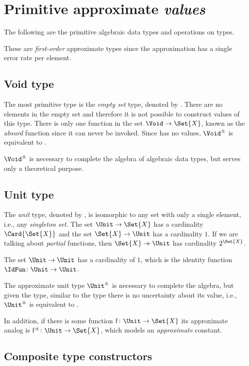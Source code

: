 \documentclass[ ../main.tex]{subfiles}
\begin{document}
\section{Primitive approximate \emph{values}}
\label{sec:prims}
The following are the primitive algebraic data types and operations on types.

These are \emph{first-order} approximate types since the approximation has a single error rate per element.

\subsection{Void type}
The most primitive type is the \emph{empty set} type, denoted by \Void.
There are no elements in the empty set and therefore it is not possible to construct values of this type.
There is only one function in the set $\Void \to \Set{X}$, known as the \emph{absurd} function since it can never be invoked.
Since \Void has no values, $\AT{\Void}$ is equivalent to \Void.

$\AT{\Void}$ is necessary to complete the algebra of algebraic data types, but serves only a theoretical purpose.

\subsection{Unit type}
The \emph{unit} type, denoted by \Unit, is isomorphic to any set with only a single element, i.e., any \emph{singleton set}.
The set $\Unit \to \Set{X}$ has a cardinality $\Card{\Set{X}}$ and the set $\Set{X} \to \Unit$ has a cardinality $1$.
If we are talking about \emph{partial} functions, then $\Set{X} \pfun \Unit$ has cardinality $2^{\Set{X}}$.

The set $\Unit \to \Unit$ has a cardinality of $1$, which is the identity function $\IdFun \colon \Unit \to \Unit$.

The approximate unit type $\AT{\Unit}$ is necessary to complete the algebra, but given the \Unit type, similar to the \Void type there is no uncertainty about its value, i.e., $\AT{\Unit}$ is equivalent to \Unit.

In addition, if there is some function $\Fun{f} \colon \Unit \to \Set{X}$ its approximate analog is $\APFun{f} \colon \Unit \to \Set{X}$, which models an \emph{approximate} constant.

\subsection{Composite type constructors}
\end{document}

